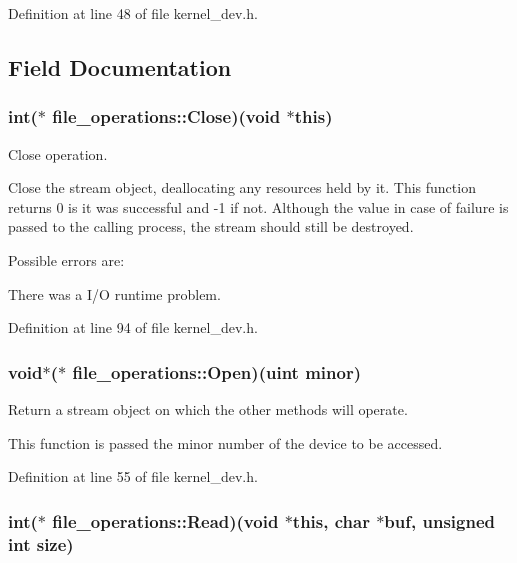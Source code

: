Definition at line 48 of file kernel\-\_\-dev.\-h.



\subsection{Field Documentation}
\hypertarget{structfile__operations_ae11b010a002957a34b54220a67919ea3}{
\subsubsection[{Close}]{\setlength{\rightskip}{0pt plus 5cm}int($\ast$ file\-\_\-operations\-::\-Close)(void $\ast$this)}}\label{structfile__operations_ae11b010a002957a34b54220a67919ea3}


Close operation. 

Close the stream object, deallocating any resources held by it. This function returns 0 is it was successful and -\/1 if not. Although the value in case of failure is passed to the calling process, the stream should still be destroyed.

Possible errors are\-:
\begin{DoxyItemize}
\item There was a I/\-O runtime problem. 
\end{DoxyItemize}

Definition at line 94 of file kernel\-\_\-dev.\-h.

\hypertarget{structfile__operations_ac7cc611291834295b031874383bf3ec6}{
\subsubsection[{Open}]{\setlength{\rightskip}{0pt plus 5cm}void$\ast$($\ast$ file\-\_\-operations\-::\-Open)({\bf uint} minor)}}\label{structfile__operations_ac7cc611291834295b031874383bf3ec6}


Return a stream object on which the other methods will operate. 

This function is passed the minor number of the device to be accessed. 

Definition at line 55 of file kernel\-\_\-dev.\-h.

\hypertarget{structfile__operations_aaec42e751424378bb7fc1ad14c701819}{
\subsubsection[{Read}]{\setlength{\rightskip}{0pt plus 5cm}int($\ast$ file\-\_\-operations\-::\-Read)(void $\ast$this, char $\ast$buf, unsigned int size)}}\label{structfile__operations_aaec42e751424378bb7fc1ad14c701819}


